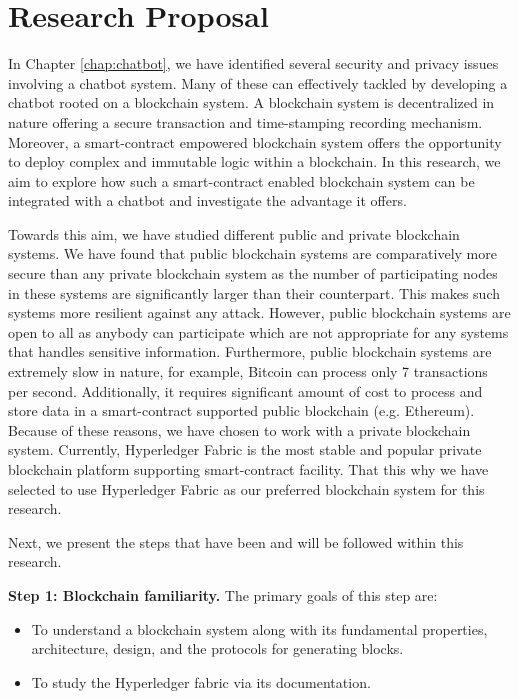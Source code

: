 \documentclass{standalone}
\begin{document}
\chapter{Research Proposal}
In Chapter \ref{chap:chatbot}, we have identified several security and privacy issues involving a chatbot system. Many of these can effectively tackled by developing a chatbot rooted on a blockchain system. A blockchain system is decentralized in nature offering a secure transaction and time-stamping recording mechanism. Moreover, a smart-contract empowered blockchain system offers the opportunity to deploy complex and immutable logic within a blockchain. In this research, we aim to explore how such a smart-contract enabled blockchain system can be integrated with a chatbot and investigate the advantage it offers. 

Towards this aim, we have studied different public and private blockchain systems. We have found that public blockchain systems are comparatively more secure than any private blockchain system as the number of participating nodes in these systems are significantly larger than their counterpart. This makes such systems more resilient against any attack. However, public blockchain systems are open to all as anybody can participate which are not appropriate for any systems that handles sensitive information. Furthermore, public blockchain systems are extremely slow in nature, for example, Bitcoin can process only 7 transactions per second. Additionally, it requires significant amount of cost to process and store data in a smart-contract supported public blockchain (e.g. Ethereum). Because of these reasons, we have chosen to work with a private blockchain system. Currently, Hyperledger Fabric is the most stable and popular private blockchain platform supporting smart-contract facility. That this why we have selected to use Hyperledger Fabric as our preferred blockchain system for this research.

Next, we present the steps that have been and will be followed within this research.



{\textbf{Step 1: Blockchain familiarity.}} The primary goals of this step are:
	\begin{itemize}
		\item To understand a blockchain system along with its fundamental properties, architecture, design, and the protocols for generating blocks. 
        \item To study the Hyperledger fabric via its documentation.
	\end{itemize}
\end{document}
